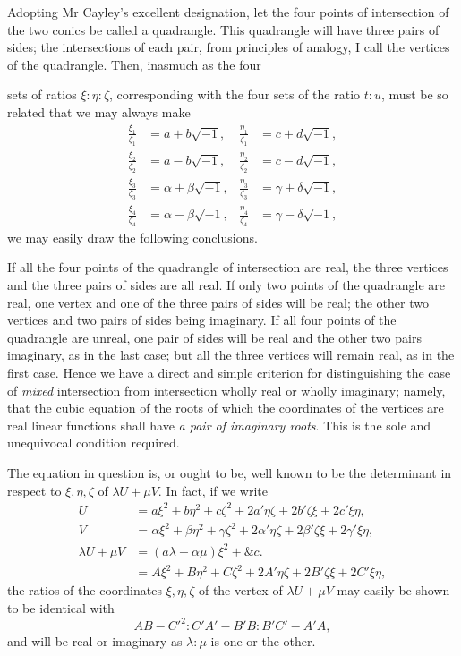 \documentclass[11pt]{article}
\newcommand{\sourcepage}[1]{\marginpar{\scriptsize p.~#1}}
\begin{document}
Adopting Mr Cayley's excellent designation, let the four points of intersection of the two conics be called a quadrangle. This quadrangle will have three pairs of sides; the intersections of each pair, from principles of analogy, I call the vertices of the quadrangle. Then, inasmuch as the four

\sourcepage{120}
sets of ratios $\xi:\eta:\zeta$, corresponding with the four sets of the ratio $t:u$, must be so related that we may always make
\[
\begin{aligned}
\frac{\xi_1}{\zeta_1}&=a+b\sqrt{-1},&
\frac{\eta_1}{\zeta_1}&=c+d\sqrt{-1},\\
\frac{\xi_2}{\zeta_2}&=a-b\sqrt{-1},&
\frac{\eta_2}{\zeta_2}&=c-d\sqrt{-1},\\
\frac{\xi_3}{\zeta_3}&=\alpha+\beta\sqrt{-1},&
\frac{\eta_3}{\zeta_3}&=\gamma+\delta\sqrt{-1},\\
\frac{\xi_4}{\zeta_4}&=\alpha-\beta\sqrt{-1},&
\frac{\eta_4}{\zeta_4}&=\gamma-\delta\sqrt{-1},
\end{aligned}
\]
we may easily draw the following conclusions.

If all the four points of the quadrangle of intersection are real, the three vertices and the three pairs of sides are all real. If only two points of the quadrangle are real, one vertex and one of the three pairs of sides will be real; the other two vertices and two pairs of sides being imaginary. If all four points of the quadrangle are unreal, one pair of sides will be real and the other two pairs imaginary, as in the last case; but all the three vertices will remain real, as in the first case. Hence we have a direct and simple criterion for distinguishing the case of \emph{mixed} intersection from intersection wholly real or wholly imaginary; namely, that the cubic equation of the roots of which the coordinates of the vertices are real linear functions shall have \emph{a pair of imaginary roots}. This is the sole and unequivocal condition required.

The equation in question is, or ought to be, well known to be the determinant in respect to $\xi,\eta,\zeta$ of $\lambda U+\mu V$. In fact, if we write
\[
\begin{aligned}
U&=a\xi^2+b\eta^2+c\zeta^2+2a'\eta\zeta+2b'\zeta\xi+2c'\xi\eta,\\
V&=\alpha\xi^2+\beta\eta^2+\gamma\zeta^2+2\alpha'\eta\zeta+2\beta'\zeta\xi+2\gamma'\xi\eta,\\
\lambda U+\mu V&=(a\lambda+\alpha\mu)\xi^2+\&c.\\
&=A\xi^2+B\eta^2+C\zeta^2+2A'\eta\zeta+2B'\zeta\xi+2C'\xi\eta,
\end{aligned}
\]
the ratios of the coordinates $\xi,\eta,\zeta$ of the vertex of $\lambda U+\mu V$ may easily be shown to be identical with
\[
AB-C'^2:C'A'-B'B:B'C'-A'A,
\]
and will be real or imaginary as $\lambda:\mu$ is one or the other.
\end{document}
